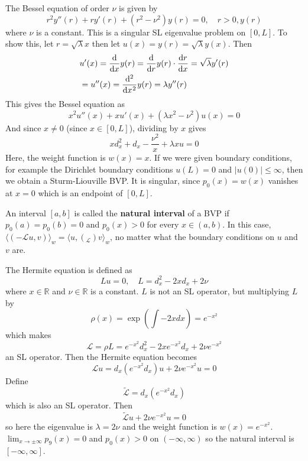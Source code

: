 \begin{example}
	The Bessel equation of order $\nu$ is given by
	\[
		r^2 y''(r) + r y'(r) + (r^2 - \nu^2) y(r) = 0, \quad r > 0, y(r)
	\]
	where $\nu$ is a constant. This is a singular SL eigenvalue problem on $[0, L]$. To show this, let $r = \sqrt{\lambda} x$ then let $u(x) = y(r) = \sqrt{\lambda} y(x)$. Then
	\[
		\begin{aligned}
			& u'(x) = \diff{}{x} y(r) = \diff{}{r} y(r) \cdot \diff{r}{x} = \sqrt{\lambda} y'(r) \\
			& = u''(x) = \diff[2]{}{x} y(r) = \lambda y''(r)
		\end{aligned}
	\]
	This gives the Bessel equation as
	\[
		x^2 u''(x) + x u'(x) + (\lambda x^2 - \nu^2) u(x) = 0
	\]
	And since $x \ne 0$ (since $x \in [0, L]$), dividing by $x$ gives
	\[
		x d_x^2 + d_x - \frac{\nu^2}{x} + \lambda x u = 0
	\]
	Here, the weight function is $w(x) = x$. If we were given boundary conditions, for example the Dirichlet boundary conditions $u(L) = 0$ and $|u(0)| \le \infty$, then we obtain a Sturm-Liouville BVP. It is singular, since $p_0(x) = w(x)$ vanishes at $x = 0$ which is an endpoint of $[0, L]$.
\end{example}

\begin{definition}
	An interval $[a, b]$ is called the \textbf{natural interval} of a BVP if $p_0(a) = p_0(b) = 0$ and $p_0(x) > 0$ for every $x \in (a, b)$. In this case, ${\langle (-\mathcal{L} u, v) \rangle}_w = {\langle u, (_\mathcal{L}) v \rangle}_w$, no matter what the boundary conditions on $u$ and $v$ are.
\end{definition}

\begin{example}
	The Hermite equation is defined as
	\[
		Lu = 0, \quad L = d_x^2 - 2x d_x + 2 \nu
	\]
	where $x \in \mathbb{R}$ and $\nu \in \mathbb{R}$ is a constant. $L$ is not an SL operator, but multiplying $L$ by
	\[
		\rho(x) = \exp \left( \int -2x dx \right) = e^{-x^2}
	\]
	which makes
	\[
		\mathcal{L} = \rho L = e^{-x^2} d_x^2 - 2x e^{-x^2} d_x + 2 \nu e^{-x^2}
	\]
	an SL operator. Then the Hermite equation becomes
	\[
		\mathcal{L} u = d_x (e^{-x^2} d_x) u + 2 \nu e^{-x^2} u = 0
	\]
	Define
	\[
		\tilde{\mathcal{L}} = d_x (e^{-x^2} d_x)
	\]
	which is also an SL operator. Then
	\[
		\tilde{\mathcal{L}} u + 2 \nu e^{-x^2} u = 0
	\]
	so here the eigenvalue is $\lambda = 2 \nu$ and the weight function is $w(x) = e^{-x^2}$. $\lim_{x \rightarrow \pm \infty} p_9(x) = 0$ and $p_0(x) > 0$ on $(-\infty, \infty)$ so the natural interval is $[-\infty, \infty]$.
\end{example}

